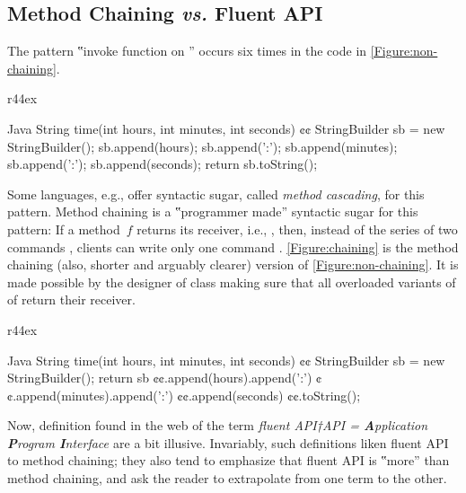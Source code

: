 \subsection{Method Chaining \emph{vs.} Fluent API}
The pattern ‟invoke function on ” occurs
  six times in the code in \cref{Figure:non-chaining}.

\begin{wrapfigure}[10]{r}{44ex}
  \caption{\label{Figure:non-chaining}%
    Recurring invocations of the pattern ‟invoke function on the same
      receiver”.
  }
  \begin{lcode}[minipage,width=\linewidth]{Java}
String time(int hours, int minutes, int seconds) {¢¢
  StringBuilder sb = new StringBuilder();
  sb.append(hours);
  sb.append(':');
  sb.append(minutes);
  sb.append(':');
  sb.append(seconds);
  return sb.toString();
}\end{lcode}
\end{wrapfigure}

Some languages, e.g., \Smalltalk offer syntactic sugar, called \emph{method cascading}, for this pattern.
Method chaining is a ‟programmer made” syntactic sugar for this pattern:
  If a method~$f$ returns its receiver, i.e., ,
  then, instead of the series of two commands \mbox{}, clients can write
  only one command \mbox{}.
\cref{Figure:chaining} is the method chaining
  (also, shorter and arguably clearer) version of
  \cref{Figure:non-chaining}.
It is made possible by the designer of class  making sure that all overloaded variants of
  of  return their receiver.

\begin{wrapfigure}[8]{r}{44ex}
  \caption{\label{Figure:chaining}%
    Method chaining onto an object of class .
  }
  \begin{lcode}[minipage,width=\linewidth]{Java}
String time(int hours, int minutes, int seconds) {¢¢
  StringBuilder sb = new StringBuilder();
    return sb
      ¢¢.append(hours).append(':')
      ¢¢.append(minutes).append(':')
      ¢¢.append(seconds)
      ¢¢.toString();
}\end{lcode}
\end{wrapfigure}

Now, definition found in the web of the term \emph{fluent API†{API =
    \textbf Application \textbf Program \textbf Interface
}} are a bit illusive.
Invariably, such definitions liken fluent API to method chaining;
  they also tend to emphasize that fluent API is ‟more” than method
  chaining, and ask the reader to extrapolate from one term to the other.

